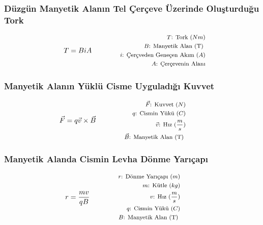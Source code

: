 \subsubsection*{Düzgün Manyetik Alanın Tel Çerçeve Üzerinde Oluşturduğu Tork}
\begin{equation}
    T = B i A \qquad \qquad \parbox{4cm}{\footnotesize$\begin{aligned}
        T\text{: Tork } (Nm) \\
        B\text{: Manyetik Alan (T) } \\
        i\text{: Çerçveden Geneçen Akım } (A) \\
        A\text{: Çerçevenin Alanı} \\
\end{aligned}$}
\end{equation}

\subsubsection*{Manyetik Alanın Yüklü Cisme Uyguladığı Kuvvet}
\begin{equation}
    \vec{F} = q \vec{v} \times \vec{B} \qquad \qquad \parbox{4cm}{\footnotesize$\begin{aligned}
        \vec{F}\text{: Kuvvet } (N) \\
        q\text{: Cismin Yükü } (C) \\
        \vec{v}\text{: Hız } (\frac{m}{s}) \\
        \vec{B}\text{: Manyetik Alan (T) }
\end{aligned}$}
\end{equation}

\subsubsection*{Manyetik Alanda Cismin Levha Dönme Yarıçapı}
\begin{equation}
    r = \frac{m v}{q B} \qquad \qquad \parbox{4cm}{\footnotesize$\begin{aligned}
        r\text{: Dönme Yarıçapı } (m) \\
        m\text{: Kütle } (kg) \\
        v\text{: Hız } (\frac{m}{s}) \\
        q\text{: Cismin Yükü } (C) \\
        B\text{: Manyetik Alan (T) }
\end{aligned}$}
\end{equation}

